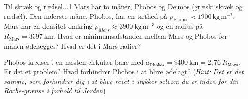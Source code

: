 
\begin{opgave}{Til skræk og rædsel...}{1}
Mars har to måner, Phobos og Deimos (græsk: skræk og rædsel). Den inderste måne, Phobos, har en tæthed på
    $\rho_\text{Phobos}\approx \SI{1900}{\kg\, \m^{-3}}$. Mars har en densitet
    omkring $\rho_{Mars}\approx \SI{3900}{\kg\,\m^{-3}}$ og en radius på
    $R_\text{Mars}=\SI{3397}{\km}$.   
 \opg Hvad er minimumsafstanden mellem Mars og Phobos før månen ødelægges? Hvad er det i Mars radier?
 
Phobos kredser i en næsten cirkulær bane med $a_\text{Phobos}=\SI{9400}{\km} = 2,76 ~R_\text{Mars}$.
\opg Er det et problem? Hvad forhindrer Phobos i at blive ødelagt? (\emph{Hint: Det er det samme,
  som forhindrer dig i at blive revet i stykker selvom du er inden
  for din Roche-grænse i forhold til Jorden})
\end{opgave}

